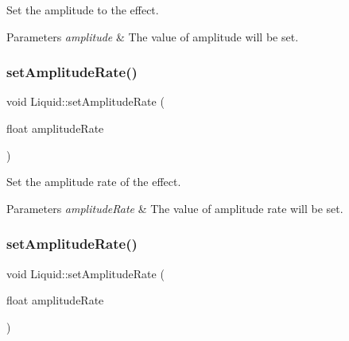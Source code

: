 Set the amplitude to the effect. 


\begin{DoxyParams}{Parameters}
{\em amplitude} & The value of amplitude will be set. \\
\hline
\end{DoxyParams}
\mbox{\label{classLiquid_a2472c32e0f54760e8bfb9c2b21424220}} 
\subsubsection{\texorpdfstring{set\+Amplitude\+Rate()}{setAmplitudeRate()}\hspace{0.1cm}{\footnotesize\ttfamily [1/2]}}
{\footnotesize\ttfamily void Liquid\+::set\+Amplitude\+Rate (\begin{DoxyParamCaption}\item[{float}]{amplitude\+Rate }\end{DoxyParamCaption})\hspace{0.3cm}{\ttfamily [inline]}}



Set the amplitude rate of the effect. 


\begin{DoxyParams}{Parameters}
{\em amplitude\+Rate} & The value of amplitude rate will be set. \\
\hline
\end{DoxyParams}
\mbox{\label{classLiquid_a2472c32e0f54760e8bfb9c2b21424220}} 
\subsubsection{\texorpdfstring{set\+Amplitude\+Rate()}{setAmplitudeRate()}\hspace{0.1cm}{\footnotesize\ttfamily [2/2]}}
{\footnotesize\ttfamily void Liquid\+::set\+Amplitude\+Rate (\begin{DoxyParamCaption}\item[{float}]{amplitude\+Rate }\end{DoxyParamCaption})\hspace{0.3cm}{\ttfamily [inline]}}




